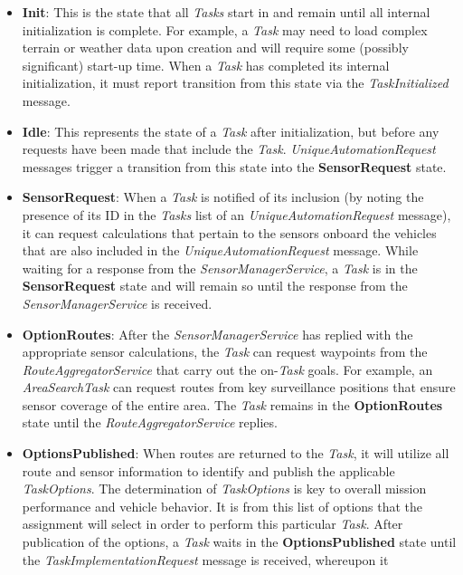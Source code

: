 \begin{itemize}
\item
  \textbf{Init}: This is the state that all \emph{Tasks} start in and
  remain until all internal initialization is complete. For example, a
  \emph{Task} may need to load complex terrain or weather data upon
  creation and will require some (possibly significant) start-up time.
  When a \emph{Task} has completed its internal initialization, it must
  report transition from this state via the \emph{TaskInitialized}
  message.
\item
  \textbf{Idle}: This represents the state of a \emph{Task} after
  initialization, but before any requests have been made that include
  the \emph{Task}. \emph{UniqueAutomationRequest} messages trigger a
  transition from this state into the \textbf{SensorRequest} state.
\item
  \textbf{SensorRequest}: When a \emph{Task} is notified of its
  inclusion (by noting the presence of its ID in the \emph{Tasks} list
  of an \emph{UniqueAutomationRequest} message), it can request
  calculations that pertain to the sensors onboard the vehicles that are
  also included in the \emph{UniqueAutomationRequest} message. While
  waiting for a response from the \emph{SensorManagerService}, a
  \emph{Task} is in the \textbf{SensorRequest} state and will remain so
  until the response from the \emph{SensorManagerService} is received.
\item
  \textbf{OptionRoutes}: After the \emph{SensorManagerService} has
  replied with the appropriate sensor calculations, the \emph{Task} can
  request waypoints from the \emph{RouteAggregatorService} that carry
  out the on-\emph{Task} goals. For example, an \emph{AreaSearchTask}
  can request routes from key surveillance positions that ensure sensor
  coverage of the entire area. The \emph{Task} remains in the
  \textbf{OptionRoutes} state until the \emph{RouteAggregatorService}
  replies.
\item
  \textbf{OptionsPublished}: When routes are returned to the
  \emph{Task}, it will utilize all route and sensor information to
  identify and publish the applicable \emph{TaskOptions}. The
  determination of \emph{TaskOptions} is key to overall mission
  performance and vehicle behavior. It is from this list of options that
  the assignment will select in order to perform this particular
  \emph{Task}. After publication of the options, a \emph{Task} waits in
  the \textbf{OptionsPublished} state until the
  \emph{TaskImplementationRequest} message is received, whereupon it

\end{itemize}
